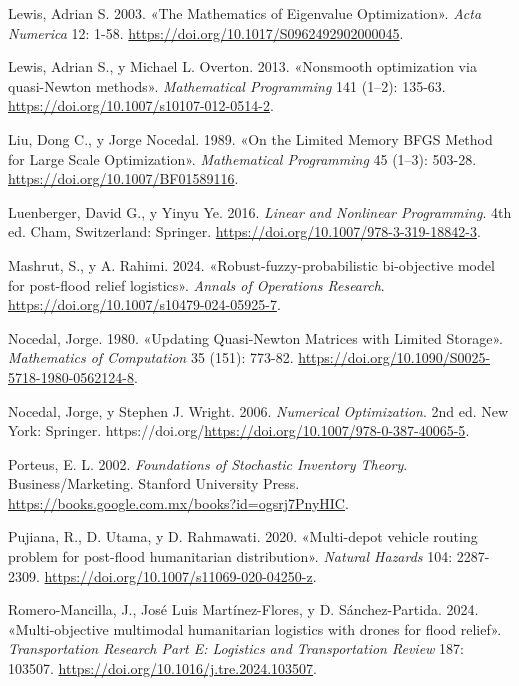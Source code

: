 \documentclass[
  spanish,
  us-letterpaper,
]{scrreprt}
\newlength{\cslhangindent}
\newenvironment{CSLReferences}[2] %
 {\begin{list}{}{%
  \setlength{\itemindent}{0pt}
  \setlength{\leftmargin}{0pt}
  \setlength{\parsep}{0pt}
  \ifodd #1
   \setlength{\leftmargin}{\cslhangindent}
   \setlength{\itemindent}{-1\cslhangindent}
  \fi
  \setlength{\itemsep}{#2\baselineskip}}}
 {\end{list}}
\numberwithin{equation}{section}
\begin{document}
\begin{CSLReferences}{1}{0}
Lewis, Adrian S. 2003. {«The Mathematics of Eigenvalue Optimization»}.
\emph{Acta Numerica} 12: 1-58.
\url{https://doi.org/10.1017/S0962492902000045}.

Lewis, Adrian S., y Michael L. Overton. 2013. {«Nonsmooth optimization
via quasi-Newton methods»}. \emph{Mathematical Programming} 141 (1--2):
135-63. \url{https://doi.org/10.1007/s10107-012-0514-2}.

Liu, Dong C., y Jorge Nocedal. 1989. {«On the Limited Memory BFGS Method
for Large Scale Optimization»}. \emph{Mathematical Programming} 45
(1--3): 503-28. \url{https://doi.org/10.1007/BF01589116}.

Luenberger, David G., y Yinyu Ye. 2016. \emph{Linear and Nonlinear
Programming}. 4th ed. Cham, Switzerland: Springer.
\url{https://doi.org/10.1007/978-3-319-18842-3}.

Mashrut, S., y A. Rahimi. 2024. {«Robust-fuzzy-probabilistic
bi-objective model for post-flood relief logistics»}. \emph{Annals of
Operations Research}. \url{https://doi.org/10.1007/s10479-024-05925-7}.

Nocedal, Jorge. 1980. {«Updating Quasi-Newton Matrices with Limited
Storage»}. \emph{Mathematics of Computation} 35 (151): 773-82.
\url{https://doi.org/10.1090/S0025-5718-1980-0562124-8}.

Nocedal, Jorge, y Stephen J. Wright. 2006. \emph{Numerical
Optimization}. 2nd ed. New York: Springer.
https://doi.org/\url{https://doi.org/10.1007/978-0-387-40065-5}.

Porteus, E. L. 2002. \emph{Foundations of Stochastic Inventory Theory}.
Business/Marketing. Stanford University Press.
\url{https://books.google.com.mx/books?id=ogsrj7PnyHIC}.

Pujiana, R., D. Utama, y D. Rahmawati. 2020. {«Multi-depot vehicle
routing problem for post-flood humanitarian distribution»}.
\emph{Natural Hazards} 104: 2287-2309.
\url{https://doi.org/10.1007/s11069-020-04250-z}.

Romero-Mancilla, J., José Luis Martínez-Flores, y D. Sánchez-Partida.
2024. {«Multi-objective multimodal humanitarian logistics with drones
for flood relief»}. \emph{Transportation Research Part E: Logistics and
Transportation Review} 187: 103507.
\url{https://doi.org/10.1016/j.tre.2024.103507}.


\end{CSLReferences}
\end{document}

